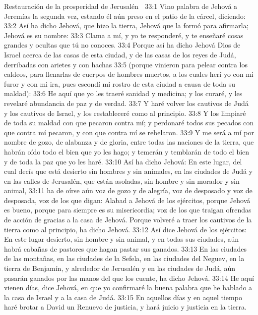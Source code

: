 Restauración de la prosperidad de Jerusalén  

33:1 Vino palabra de Jehová a Jeremías la segunda vez, estando él aún preso en el patio de la cárcel, diciendo:  
33:2 Así ha dicho Jehová, que hizo la tierra, Jehová que la formó para afirmarla; Jehová es su nombre:  
33:3 Clama a mí, y yo te responderé, y te enseñaré cosas grandes y ocultas que tú no conoces.  
33:4 Porque así ha dicho Jehová Dios de Israel acerca de las casas de esta ciudad, y de las casas de los reyes de Judá, derribadas con arietes y con hachas  
33:5 (porque vinieron para pelear contra los caldeos, para llenarlas de cuerpos de hombres muertos, a los cuales herí yo con mi furor y con mi ira, pues escondí mi rostro de esta ciudad a causa de toda su maldad):  
33:6 He aquí que yo les traeré sanidad y medicina; y los curaré, y les revelaré abundancia de paz y de verdad.  
33:7 Y haré volver los cautivos de Judá y los cautivos de Israel, y los restableceré como al principio.  
33:8 Y los limpiaré de toda su maldad con que pecaron contra mí; y perdonaré todos sus pecados con que contra mí pecaron, y con que contra mí se rebelaron.  
33:9 Y me será a mí por nombre de gozo, de alabanza y de gloria, entre todas las naciones de la tierra, que habrán oído todo el bien que yo les hago; y temerán y temblarán de todo el bien y de toda la paz que yo les haré.  
33:10 Así ha dicho Jehová: En este lugar, del cual decís que está desierto sin hombres y sin animales, en las ciudades de Judá y en las calles de Jerusalén, que están asoladas, sin hombre y sin morador y sin animal,  
33:11 ha de oírse aún voz de gozo y de alegría, voz de desposado y voz de desposada, voz de los que digan: Alabad a Jehová de los ejércitos, porque Jehová es bueno, porque para siempre es su misericordia; voz de los que traigan ofrendas de acción de gracias a la casa de Jehová. Porque volveré a traer los cautivos de la tierra como al principio, ha dicho Jehová.  
33:12 Así dice Jehová de los ejércitos: En este lugar desierto, sin hombre y sin animal, y en todas sus ciudades, aún habrá cabañas de pastores que hagan pastar sus ganados.  
33:13 En las ciudades de las montañas, en las ciudades de la Sefela, en las ciudades del Neguev, en la tierra de Benjamín, y alrededor de Jerusalén y en las ciudades de Judá, aún pasarán ganados por las manos del que los cuente, ha dicho Jehová.  
33:14 He aquí vienen días, dice Jehová, en que yo confirmaré la buena palabra que he hablado a la casa de Israel y a la casa de Judá.  
33:15 En aquellos días y en aquel tiempo haré brotar a David un Renuevo de justicia, y hará juicio y justicia en la tierra.  
